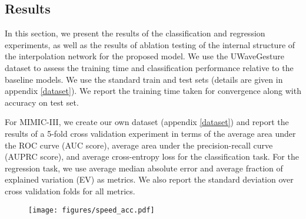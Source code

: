\documentclass{article} \usepackage{iclr2019_conference,times}
\begin{document}
\subsection{Results}
In this section, we present the results of the classification and regression
experiments, as well as the results of ablation testing of the internal structure of the 
interpolation network for the proposed model. We use the UWaveGesture dataset to assess the training time and classification performance relative to the baseline models. We use the standard train and test sets (details are given in appendix \ref{dataset}). We report the training time taken for convergence along  with accuracy on test set. 

For MIMIC-III, we create our own dataset (appendix \ref{dataset}) and report the results of a 5-fold cross validation experiment in terms of the average area under the ROC curve (AUC score), average area under the precision-recall curve (AUPRC score), and average cross-entropy loss for the classification task. For  the regression task, we use average median absolute error and average fraction of explained variation  (EV) as metrics. We also report the standard deviation over cross validation folds for all metrics. 

\begin{figure}[h]
\centering
  \texttt{[image: figures/speed\_acc.pdf]}
  \label{fig:uwave}
\end{figure}
\end{document}
